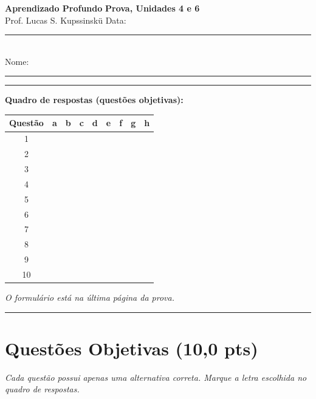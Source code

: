 \documentclass[11pt,a4paper]{article}
\begin{document}
{\Large\bfseries Aprendizado Profundo} \hfill \textbf{Prova, Unidades 4 e 6}\\
Prof. Lucas S. Kupssinskü \hfill Data: \rule{3cm}{0.4pt}\\[0.4em]
Nome: \rule{12cm}{0.4pt}

\rule{\linewidth}{0.8pt}

\textbf{Quadro de respostas (questões objetivas):}\\[0.3em]
\begin{center}
\begin{tabular}{|c|c|c|c|c|c|c|c|c|}
\hline
\textbf{Questão} & \textbf{a} & \textbf{b} & \textbf{c} & \textbf{d} & \textbf{e} & \textbf{f} & \textbf{g} & \textbf{h} \\\hline
1  & & & & & & & & \\\hline
2  & & & & & & & & \\\hline
3  & & & & & & & & \\\hline
4  & & & & & & & & \\\hline
5  & & & & & & & & \\\hline
6  & & & & & & & & \\\hline
7  & & & & & & & & \\\hline
8  & & & & & & & & \\\hline
9  & & & & & & & & \\\hline
10 & & & & & & & & \\\hline
\end{tabular}
\end{center}

\textit{O formulário está na última página da prova.}

\rule{\linewidth}{0.4pt}

\section*{Questões Objetivas (10{,}0 pts)}
\textit{Cada questão possui apenas uma alternativa correta. Marque a letra escolhida no quadro de respostas.}
\end{document}
